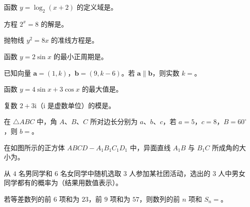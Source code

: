 \begin{question}
函数 $y=\log_2(x+2)$ 的定义域是\gkblank{}。

\end{question}
\begin{question}
方程 $2^x=8$ 的解是\gkblank{}。

\end{question}
\begin{question}
抛物线 $y^2=8x$ 的准线方程是\gkblank{}。

\end{question}
\begin{question}
函数 $y=2\sin x$ 的最小正周期是\gkblank{}。

\end{question}
\begin{question}
已知向量 $\boldsymbol a=(1,k)$，$\boldsymbol b=(9,k-6)$。若 $\boldsymbol a\parallel\boldsymbol b$，则实数 $k=$\gkblank{}。

\end{question}
\begin{question}
函数 $y=4\sin x+3\cos x$ 的最大值是\gkblank{}。

\end{question}
\begin{question}
复数 $2+3\mathrm i$（$\mathrm i$ 是虚数单位）的模是\gkblank{}。

\end{question}
\begin{question}
在 $\triangle ABC$ 中，角 $A$、$B$、$C$ 所对边长分别为 $a$、$b$、$c$，若 $a=5$，$c=8$，$B=60^\circ$，则 $b=$\gkblank{}。

\Needspace{0.4\textheight}
\end{question}
\begin{question}
在如图所示的正方体 $ABCD-A_1B_1C_1D_1$ 中，异面直线 $A_1B$ 与 $B_1C$ 所成角的大小为\gkblank{}。
\nopagebreak[4]
\begin{center}\end{center}
\nopagebreak[4]
\end{question}
\begin{question}
从 $4$ 名男同学和 $6$ 名女同学中随机选取 $3$ 人参加某社团活动，选出的 $3$ 人中男女同学都有的概率为\gkblank{}（结果用数值表示）。

\end{question}
\begin{question}
若等差数列的前 $6$ 项和为 $23$，前 $9$ 项和为 $57$，则数列的前 $n$ 项和 $S_n=$\gkblank{}。

\end{question}
